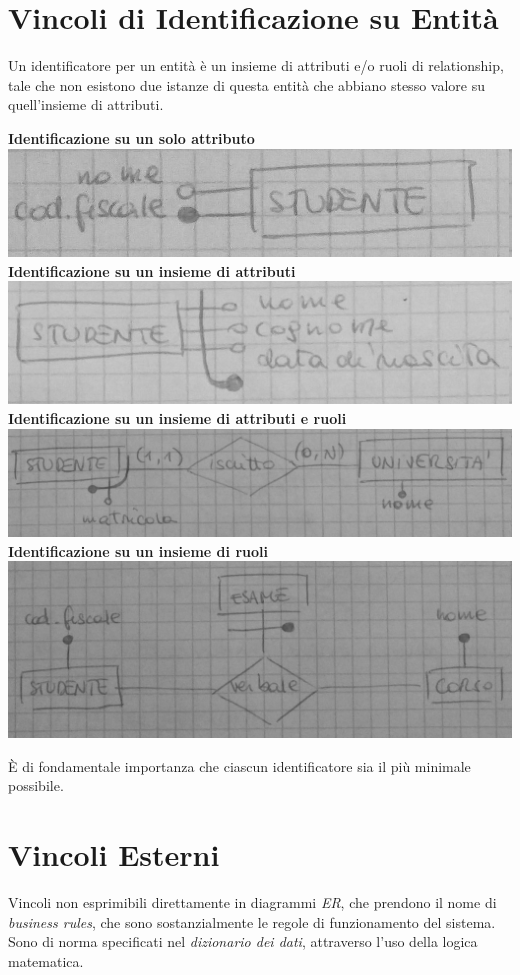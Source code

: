 \section{Vincoli di Identificazione su Entità}
Un identificatore per un entità è un insieme di attributi e/o ruoli di relationship, tale che non esistono due istanze di questa entità che abbiano stesso valore su quell'insieme di attributi.
\begin{center}
    \textbf{Identificazione su un solo attributo} \\
    \includegraphics[width=.7\textwidth]{res/er-identificazione-1.jpg} \\
    \textbf{Identificazione su un insieme di attributi} \\
    \includegraphics[width=.7\textwidth]{res/er-identificazione-2.jpg} \\
    \textbf{Identificazione su un insieme di attributi e ruoli} \\
    \includegraphics[width=.7\textwidth]{res/er-identificazione-3.jpg} \\
    \textbf{Identificazione su un insieme di ruoli} \\
    \includegraphics[width=.7\textwidth]{res/er-identificazione-4.jpg} \\
\end{center}
È di fondamentale importanza che ciascun identificatore sia il più minimale possibile.

\section{Vincoli Esterni}
Vincoli non esprimibili direttamente in diagrammi \textit{ER}, che prendono il nome di \textit{business rules}, che sono sostanzialmente le regole di funzionamento del sistema. Sono di norma specificati nel \textit{dizionario dei dati}, attraverso l'uso della logica matematica.